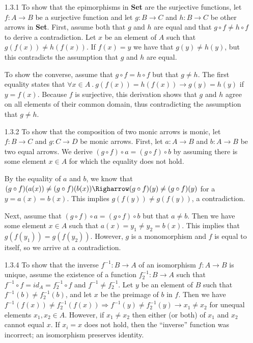 \documentclass{article}
\begin{document}
\begin{enumerate}
\item[1.3.1]
  To show that the epimorphisms in \textbf{Set} are the surjective functions, let $f : A \rightarrow B$ be a surjective function and let $g : B \rightarrow C$ and $h : B \rightarrow C$ be other arrows in \textbf{Set}.
  First, assume both that $g$ and $h$ are equal and that $g \circ f \ne h \circ f$ to derive a contradiction.
  Let $x$ be an element of $A$ such that $g(f(x)) \ne h(f(x))$.
  If $f(x) = y$ we have that $g(y) \ne h(y)$, but this contradicts the assumption that $g$ and $h$ are equal.

  To show the converse, assume that $g \circ f = h \circ f$ but that $g \ne h$.
  The first equality states that $\forall x\in A~.~g(f(x)) = h(f(x)) \rightarrow g(y) = h(y)$ if $y = f(x)$.
  Because $f$ is surjective, this derivation shows that $g$ and $h$ agree on all elements of their common domain, thus contradicting the assumption that $g \ne h$.

\item [1.3.2]
  To show that the composition of two monic arrows is monic, let $f : B \rightarrow C$ and $g : C \rightarrow D$ be monic arrows.
  First, let $a : A \rightarrow B$ and $b : A \rightarrow B$ be two equal arrows.
  We derive $(g \circ f) \circ a = (g \circ f) \circ b$ by assuming there is some element $x \in A$ for which the equality does not hold.

  By the equality of $a$ and $b$, we know that $(g\circ f)(a(x)) \ne (g\circ f)(b(x)) \Righarrow (g\circ f)(y) \ne (g\circ f)(y)$ for a $y = a(x) = b(x)$.
  This implies $g(f(y)) \ne g(f(y))$, a contradiction.

  Next, assume that $(g\circ f) \circ a = (g\circ f) \circ b$ but that $a \ne b$.
  Then we have some element $x \in A$ such that $a(x) = y_1 \ne y_2 = b(x)$.
  This implies that $g(f(y_1)) = g(f(y_2))$.
  However, $g$ is a monomorphism and $f$ is equal to itself, so we arrive at a contradiction.


  

\item[]
\item[1.3.4]
  To show that the inverse $f^{-1} : B \rightarrow A$ of an isomorphism $f : A\rightarrow B$ is unique, assume the existence of a function $f^{-1}_2 : B \rightarrow A$ such that $f^{-1} \circ f = id_A = f^{-1}_2 \circ f$ and $f^{-1} \ne f^{-1}_2$.
  Let $y$ be an element of $B$ such that $f^{-1}(b) \ne f^{-1}_2(b)$, and let $x$ be the preimage of $b$ in $f$.
  Then we have $f^{-1}(f(x)) \ne f^{-1}_2(f(x)) \Rightarrow f^{-1}(y) \ne f^{-1}_2(y) \rightarrow x_1 \ne x_2$ for unequal elements $x_1,x_2 \in A$.
  However, if $x_1 \ne x_2$ then either (or both) of $x_1$ and $x_2$ cannot equal $x$.
  If $x_i = x$ does not hold, then the ``inverse'' function was incorrect; an isomorphism preserves identity.


\end{enumerate}
\end{document}
